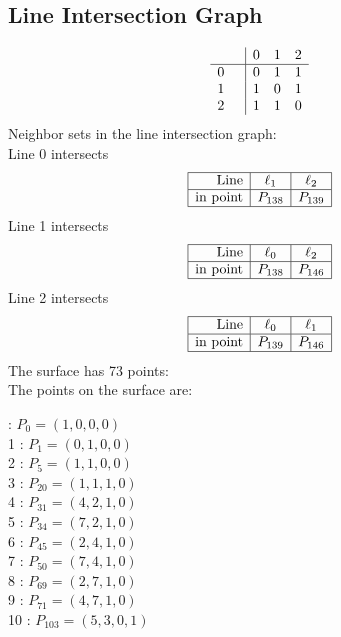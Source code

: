 \documentclass{article}
\begin{document}
{\subsection*{Line Intersection Graph}
{\arraycolsep=1pt
$$
\begin{array}{rr|*{3}r}
 &  & 0 & 1 & 2\\
\hline
0 &  & 0 & 1 & 1\\
1 &  & 1 & 0 & 1\\
2 &  & 1 & 1 & 0\\
\end{array}
$$
}%
Neighbor sets in the line intersection graph:\\
Line 0 intersects 
$$
\begin{array}{|r*{2}{|c}|}
\hline
\mbox{Line}  & \ell_{1} & \ell_{2}\\
\hline
\mbox{in point}  & P_{138} & P_{139}\\
\hline
\end{array}
$$
Line 1 intersects 
$$
\begin{array}{|r*{2}{|c}|}
\hline
\mbox{Line}  & \ell_{0} & \ell_{2}\\
\hline
\mbox{in point}  & P_{138} & P_{146}\\
\hline
\end{array}
$$
Line 2 intersects 
$$
\begin{array}{|r*{2}{|c}|}
\hline
\mbox{Line}  & \ell_{0} & \ell_{1}\\
\hline
\mbox{in point}  & P_{139} & P_{146}\\
\hline
\end{array}
$$
The surface has 73 points:\\
The points on the surface are:\\
\begin{multicols}{3}
 : $P_{0}=( 1, 0, 0, 0 )$\\
1 : $P_{1}=( 0, 1, 0, 0 )$\\
2 : $P_{5}=( 1, 1, 0, 0 )$\\
3 : $P_{20}=( 1, 1, 1, 0 )$\\
4 : $P_{31}=( 4, 2, 1, 0 )$\\
5 : $P_{34}=( 7, 2, 1, 0 )$\\
6 : $P_{45}=( 2, 4, 1, 0 )$\\
7 : $P_{50}=( 7, 4, 1, 0 )$\\
8 : $P_{69}=( 2, 7, 1, 0 )$\\
9 : $P_{71}=( 4, 7, 1, 0 )$\\
10 : $P_{103}=( 5, 3, 0, 1 )$\\

\end{multicols}}
\end{document}
